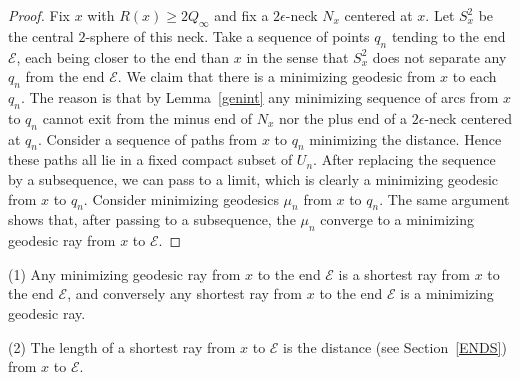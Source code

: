 \begin{proof}
\sketch
Fix $x$ with $R(x)\ge 2Q_\infty$ and fix a $2\epsilon$-neck $N_x$
centered at $x$. Let $S_x^2$ be the central $2$-sphere of this neck.
Take a sequence of points $q_n$ tending to the end ${\mathcal E}$,
each being closer to the end than $x$ in the sense that $S^2_x$ does
not separate any $q_n$ from the end ${\mathcal E}$. We claim that
there is a minimizing geodesic from $x$ to each $q_n$. The reason is
that by Lemma~\ref{genint} any minimizing sequence of arcs from $x$
to $q_n$ cannot exit from the minus end of $N_x$ nor the plus end of
a $2\epsilon$-neck centered at $q_n$. Consider a sequence of paths
from $x$ to $q_n$ minimizing the distance.  Hence these paths all
lie in a fixed compact subset of $U_n$. After replacing the sequence
by a subsequence, we can pass to a limit, which is clearly a
minimizing geodesic from $x$ to $q_n$. Consider minimizing geodesics
$\mu_n$ from $x$ to $q_n$. The same argument shows that, after
passing to a subsequence, the $\mu_n$ converge to a minimizing
geodesic ray from $x$ to ${\mathcal E}$.
\end{proof}


\begin{claim}
\label{claim:shortest-ray-equivalence}
(1) Any minimizing geodesic ray from $x$ to the end ${\mathcal E}$
is a shortest ray from $x$ to the end ${\mathcal E}$, and conversely
any shortest ray from $x$ to the end ${\mathcal E}$ is a minimizing
geodesic ray.

(2) The length of a shortest ray from $x$ to ${\mathcal E}$ is the
distance (see Section~\ref{ENDS}) from $x$ to ${\mathcal E}$.
\end{claim}


